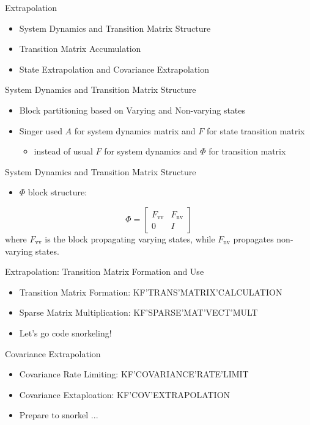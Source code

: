 \begin{frame}
Extrapolation
 \begin{itemize}
 \item System Dynamics and Transition Matrix Structure
 \item Transition Matrix Accumulation
 \item State Extrapolation and Covariance Extrapolation
\end{itemize}
\end{frame}

\begin{frame}
System Dynamics and Transition Matrix Structure
\begin{itemize}
  \item Block partitioning based on Varying and Non-varying states
  \item Singer used $A$ for system dynamics matrix and $F$ for state transition matrix
	\begin{itemize}
		\item instead of usual $F$ for system dynamics and $\Phi$ for transition matrix
	\end{itemize}
\end{itemize} 

\end{frame}

\begin{frame}
System Dynamics and Transition Matrix Structure
\begin{itemize}
  \item $\Phi$ block structure: 
\end{itemize} 
\begin{equation}
\Phi = 
\begin{bmatrix}
F_{\text{vv}} & F_{\text{nv}}\\
0 & I
\end{bmatrix}
\end{equation} 
where $F_{\text{vv}}$ is the block propagating varying states, while $F_{\text{nv}}$ propagates non-varying states.
\end{frame}

\begin{frame}
Extrapolation: Transition Matrix Formation and Use
\begin{itemize}
  \item Transition Matrix Formation: KF'TRANS'MATRIX'CALCULATION
  \item Sparse Matrix Multiplication: KF'SPARSE'MAT'VECT'MULT
  \item Let's go code snorkeling!
\end{itemize} 
\end{frame}

\begin{frame}
Covariance Extrapolation
\begin{itemize}
  \item Covariance Rate Limiting: KF'COVARIANCE'RATE'LIMIT
  \item Covariance Extaploation: KF'COV'EXTRAPOLATION
  \item Prepare to snorkel ...
\end{itemize} 
\end{frame}
